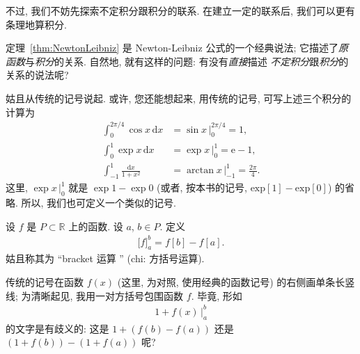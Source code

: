 不过, 我们不妨先探索不定积分跟积分的联系.
在建立一定的联系后, 我们可以更有条理地算积分.

定理~\ref{thm:NewtonLeibniz} 是
Newton-Leibniz 公式的一个经典说法;
它描述了\emph{原函数}与\emph{积分}的关系.
自然地, 就有这样的问题:
有没有\emph{直接}描述%
\emph{不定积分}跟\emph{积分}的关系的说法呢?

姑且从传统的记号说起.
或许, 您还能想起来, 用传统的记号, 可写上述三个积分的计算为
\begin{align*}
    \int_{0}^{2\pi/4} {\cos {x}\,\mathrm{d}x}   & = {\sin {x}} \,\Bigg|_{0}^{2\pi/4} = 1,             \\
    \int_{0}^{1} {\exp {x}\,\mathrm{d}x}        & = {\exp {x}} \,\Bigg|_{0}^{1} = \mathrm{e} - 1,     \\
    \int_{-1}^{1} {\frac{\mathrm{d}x}{1 + x^2}} & = {\arctan {x}} \,\Bigg|_{-1}^{1} = \frac{2\pi}{4}.
\end{align*}
这里, ${\exp {x}}\, \bigg|_{0}^{1}$
就是 $\exp {1} - \exp {0}$
(或者, 按本书的记号, $\mathrm{exp}[1] - \mathrm{exp}[0]$)
的省略.
所以, 我们也可定义一个类似的记号.

\begin{definition}
    设 $f$ 是 $P \subset \mathbb{R}$ 上的函数.
    设 $a$, $b \in P$.
    定义
    \begin{align*}
        \big[ f \big]_{a}^{b} = f[b] - f[a].
    \end{align*}
    姑且称其为 ``bracket 运算%
    ''
    (\gls{chi}: 方括号运算).
\end{definition}

传统的记号在函数 $f(x)$
(这里, 为对照, 使用经典的函数记号)
的右侧画单条长竖线;
为清晰起见, 我用一对方括号包围函数 $f$.
毕竟, 形如
\begin{align*}
    1 + f(x)\,\Bigg|_{a}^{b}
\end{align*}
的文字是有歧义的:
这是 $1 + (f(b) - f(a))$
还是 $(1 + f(b)) - (1 + f(a))$ 呢?

